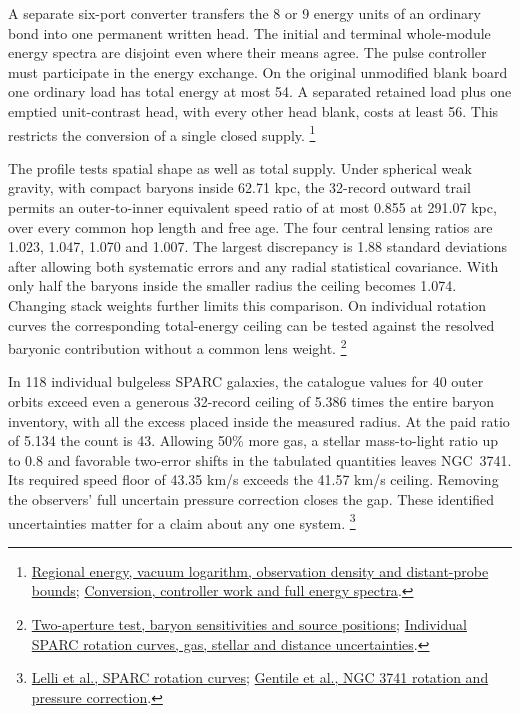 \documentclass[11pt]{article}
\begin{document}
A separate six-port converter transfers the 8 or 9 energy units of an
ordinary bond into one permanent written head. The initial and terminal
whole-module energy spectra are disjoint even where their means agree.
The pulse controller must participate in the energy exchange. On the
original unmodified blank board one ordinary load has total energy at
most 54. A separated retained load plus one emptied unit-contrast head,
with every other head blank, costs at least 56. This restricts the
conversion of a single closed supply.%
\footnote{\href{https://github.com/FloatingPragma/observer-patch-holography/tree/main/model/experiments/interval_echo_shell_flux/product_address/green_response/material_recoil/overlap_source/native_boundary/stock/aperture}{Regional energy, vacuum logarithm, observation density and distant-probe bounds};
\href{https://github.com/FloatingPragma/observer-patch-holography/tree/main/model/experiments/interval_echo_shell_flux/product_address/green_response/material_recoil/overlap_source/native_boundary/stock/supply}{Conversion, controller work and full energy spectra}.}

The profile tests spatial shape as well as total supply. Under spherical
weak gravity, with compact baryons inside 62.71 kpc, the 32-record
outward trail permits an outer-to-inner equivalent speed ratio of at
most 0.855 at 291.07 kpc, over every common hop length and free age.
The four central lensing ratios are 1.023, 1.047, 1.070 and 1.007.
The largest discrepancy is 1.88 standard deviations after allowing both
systematic errors and any radial statistical covariance. With only
half the baryons inside the smaller radius the ceiling becomes 1.074.
Changing stack weights further limits this comparison. On individual
rotation curves the corresponding total-energy ceiling can be tested
against the resolved baryonic contribution without a common lens weight.%
\footnote{\href{https://github.com/FloatingPragma/observer-patch-holography/tree/main/code/cosmology/rar_deep_regime/compensation/trail_profile}{Two-aperture test, baryon sensitivities and source positions};
\href{https://github.com/FloatingPragma/observer-patch-holography/tree/main/code/cosmology/rar_deep_regime/individual_trail_budget}{Individual SPARC rotation curves, gas, stellar and distance uncertainties}.}

In 118 individual bulgeless SPARC galaxies, the catalogue values for
40 outer orbits exceed even a generous 32-record ceiling of 5.386
times the entire baryon inventory, with all the excess placed inside
the measured radius. At the paid ratio of 5.134 the count is 43.
Allowing 50\% more gas, a stellar mass-to-light ratio up to 0.8 and
favorable two-error shifts in the tabulated quantities leaves NGC~3741.
Its required speed floor of 43.35 km/s exceeds the 41.57 km/s ceiling.
Removing the observers' full uncertain pressure correction closes the
gap. These identified uncertainties matter for a claim about any one
system.%
\footnote{\href{https://arxiv.org/abs/1606.09251}{Lelli et al., SPARC rotation curves};
\href{https://arxiv.org/abs/astro-ph/0611355}{Gentile et al., NGC 3741 rotation and pressure correction}.}
\end{document}
